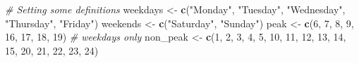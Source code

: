 \documentclass[
  12pt,
]{article}
\newenvironment{Shaded}{\begin{snugshade}}{\end{snugshade}}
\newcommand{\CommentTok}[1]{\textcolor[rgb]{0.56,0.35,0.01}{\textit{#1}}}
\newcommand{\DecValTok}[1]{\textcolor[rgb]{0.00,0.00,0.81}{#1}}
\newcommand{\FunctionTok}[1]{\textcolor[rgb]{0.13,0.29,0.53}{\textbf{#1}}}
\newcommand{\NormalTok}[1]{#1}
\newcommand{\OtherTok}[1]{\textcolor[rgb]{0.56,0.35,0.01}{#1}}
\newcommand{\StringTok}[1]{\textcolor[rgb]{0.31,0.60,0.02}{#1}}
\begin{document}
\begin{Shaded}
\begin{Highlighting}[]
\CommentTok{\# Setting some definitions}
\NormalTok{weekdays }\OtherTok{\textless{}{-}} \FunctionTok{c}\NormalTok{(}\StringTok{"Monday"}\NormalTok{, }\StringTok{"Tuesday"}\NormalTok{, }\StringTok{"Wednesday"}\NormalTok{, }\StringTok{"Thursday"}\NormalTok{, }\StringTok{"Friday"}\NormalTok{)}
\NormalTok{weekends }\OtherTok{\textless{}{-}} \FunctionTok{c}\NormalTok{(}\StringTok{"Saturday"}\NormalTok{, }\StringTok{"Sunday"}\NormalTok{)}
\NormalTok{peak }\OtherTok{\textless{}{-}} \FunctionTok{c}\NormalTok{(}\DecValTok{6}\NormalTok{, }\DecValTok{7}\NormalTok{, }\DecValTok{8}\NormalTok{, }\DecValTok{9}\NormalTok{, }\DecValTok{16}\NormalTok{, }\DecValTok{17}\NormalTok{, }\DecValTok{18}\NormalTok{, }\DecValTok{19}\NormalTok{) }\CommentTok{\# weekdays only}
\NormalTok{non\_peak }\OtherTok{\textless{}{-}} \FunctionTok{c}\NormalTok{(}\DecValTok{1}\NormalTok{, }\DecValTok{2}\NormalTok{, }\DecValTok{3}\NormalTok{, }\DecValTok{4}\NormalTok{, }\DecValTok{5}\NormalTok{, }\DecValTok{10}\NormalTok{, }\DecValTok{11}\NormalTok{, }\DecValTok{12}\NormalTok{, }\DecValTok{13}\NormalTok{, }\DecValTok{14}\NormalTok{, }\DecValTok{15}\NormalTok{, }\DecValTok{20}\NormalTok{, }\DecValTok{21}\NormalTok{, }\DecValTok{22}\NormalTok{, }\DecValTok{23}\NormalTok{, }\DecValTok{24}\NormalTok{)}


\end{Highlighting}
\end{Shaded}
\end{document}
